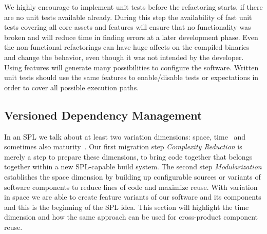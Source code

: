 We highly encourage to implement unit tests before the refactoring starts, if
there are no unit tests available already. During this step the availability of
fast unit tests covering all core assets and features will ensure that no
functionality was broken and will reduce time in finding errors at a later
development phase. Even the non-functional refactorings can have huge affects on
the compiled binaries and change the behavior, even though it was not intended
by the developer. Using features will generate many possibilities to configure
the software. Written unit tests should use the same features to enable/disable
tests or expectations in order to cover all possible execution paths.

\subsection{Versioned Dependency Management}\label{dependencies}

In an SPL we talk about at least two variation dimensions: space,
time~\cite{appliedSPLE} and sometimes also maturity~\cite{bigleverwhitepaper}.
Our first migration step \textit{Complexity Reduction} is merely a step to
prepare these dimensions, to bring code together that belongs together within a
new SPL-capable build system. The second step \textit{Modularization}
establishes the space dimension by building up configurable sources or variants
of software components to reduce lines of code and maximize reuse. With
variation in space we are able to create feature variants of our software and
its components and this is the beginning of the SPL idea. This section will
highlight the time dimension and how the same approach can be used for
cross-product component reuse.

